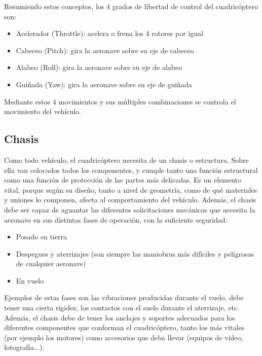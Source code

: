 \documentclass[12pt,twoside]{article}
\begin{document}
		Resumiendo estos conceptos, los 4 grados de libertad de control del cuadricóptero son:
		
		\begin{itemize}

			\item Acelerador (Throttle): acelera o frena los 4 rotores por igual
			\item Cabeceo (Pitch): gira la aeronave sobre su eje de cabeceo 
			\item Alabeo (Roll): gira la aeronave sobre su eje de alabeo
			\item	Guiñada (Yaw): gira la aeronave sobre su eje de guiñada

		\end{itemize}
		
		Mediante estos 4 movimientos y sus múltiples combinaciones se controla el movimiento del vehículo.

		\subsection{Chasis}\label{subsec:chasis}
		Como todo vehículo, el cuadricóptero necesita de un chasis o estructura. Sobre ella van colocados todos los componentes, y cumple tanto una función estructural como una función de protección de las partes más delicadas.
Es un elemento vital, porque según su diseño, tanto a nivel de geometría, como de qué materiales y uniones lo componen, afecta al comportamiento del vehículo. Además, el chasis debe ser capaz de aguantar las diferentes solicitaciones mecánicas que necesita la aeronave en sus distintas fases de operación, con la suficiente seguridad:

		\begin{itemize}

			\item Posado en tierra
			\item Despegues y aterrizajes (son siempre las maniobras más difíciles y peligrosas de cualquier aeronave)
			\item En vuelo
		\end{itemize}
		Ejemplos de estas fases son las vibraciones producidas durante el vuelo, debe tener una cierta rigidez, los contactos con el suelo durante el aterrizaje, etc.
Además, el chasis debe de tener los anclajes y soportes adecuados para los diferentes componentes que conforman el cuadricóptero, tanto los más vitales (por ejemplo los motores) como accesorios que deba llevar (equipos de video, fotografía...).
\end{document}
